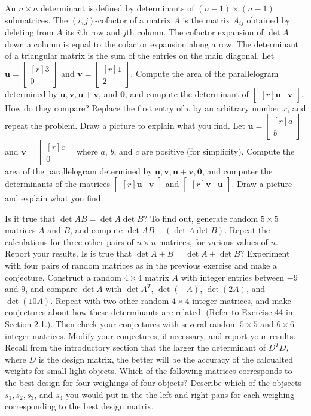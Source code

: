 \documentclass[11pt,answers]{exam} %
\renewcommand{\vec}[1]{\mathbf{#1}}
\newcommand{\mat}[1]{\begin{bmatrix*}[r] #1 \end{bmatrix*}}
\begin{document}
\begin{questions}
    \question An $n \times n$ determinant is defined by determinants of $(n-1) \times (n-1)$ submatrices.
    \question The $(i,j)$-cofactor of a matrix $A$ is the matrix $A_{ij}$ obtained by deleting from $A$ its $i$th row and $j$th column.
    \question The cofactor expansion of $\det{A}$  down a column is equal to the cofactor expansion along a row.
    \question The determinant of a triangular matrix is the sum of the entries on the main diagonal.
    \question Let $\vec{u} = \mat{3 \\ 0}$ and $\vec{v} = \mat{1 \\ 2}$. Compute the area of the parallelogram determined by $\vec{u}, \vec{v}, \vec{u}+\vec{v}$, and $\vec{0}$, and compute the determinant of $\mat{\vec{u} & \vec{v}}$. How do they compare? Replace the first entry of $v$ by an arbitrary number $x$, and repeat the problem. Draw a picture to explain what you find.
    \question Let $\vec{u} = \mat{a \\ b}$ and $\vec{v} = \mat{c \\ 0}$ where $a$, $b$, and $c$ are positive (for simplicity). Compute the area of the parallelogram determined by $\vec{u}, \vec{v}, \vec{u}+\vec{v}, \vec{0}$, and computer the determinants of the matrices $\mat{\vec{u} & \vec{v}}$ and $\mat{\vec{v} & \vec{u}}$. Draw a picture and explain what you find.
    
    \question Is it true that $\det{AB}=\det{A}\det{B}$? To find out, generate random $5\times 5$ matrices $A$ and $B$, and compute $\det{AB}-(\det{A}\det{B})$. Repeat the calculations for three other pairs of $n \times n$ matrices, for various values of $n$. Report your results.
    \question Is is true that $\det{A+ B}=\det{A} + \det{B}$? Experiment with four pairs of random matrices as in the previous exercise and make a conjecture.
    \question Construct a random $4 \times 4$ matrix $A$ with integer entries between $-9$ and $9$, and compare $\det{A}$ with $\det{A^T}$, $\det{(-A)}$, $\det{(2A)}$, and $\det{(10A)}$. Repeat with two other random $4 \times 4$ integer matrices, and make conjectures about how these determinants are related. (Refer to Exercise 44 in Section 2.1.). Then check your conjectures with several random $5\times 5$ and $6 \times 6$ integer matrices. Modify your conjectures, if necessary, and report your results.
    \question Recall from the introductory section that the larger the determinant of $D^TD$, where $D$ is the design matrix, the better will be the accuracy of the calcualted weights for small light objects. Which of the following matrices corresponds to the best design for four weighings of four objects? Describe which of the objsects $s_1, s_2, s_3$, and $s_4$ you would put in the the left and right pans for each weighing corresponding to the best design matrix.
    \begin{parts}

\end{parts}
\end{questions}
\end{document}
